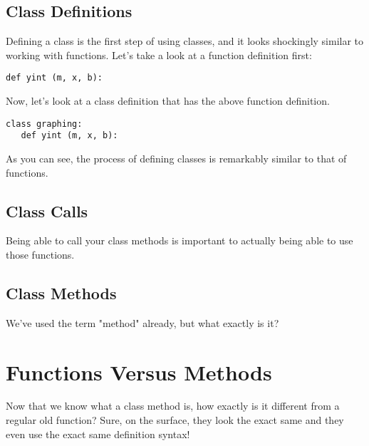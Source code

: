 \subsection{Class Definitions}
Defining a class is the first step of using classes, and it looks shockingly similar to working with functions. Let's take a look at a function definition first:\par
\begin{lstlisting}[style=pippython]
def yint (m, x, b):
\end{lstlisting}
Now, let's look at a class definition that has the above function definition.\par
\begin{lstlisting}[style=pippython]
class graphing:
   def yint (m, x, b):
\end{lstlisting}
As you can see, the process of defining classes is remarkably similar to that of functions.
\subsection{Class Calls}
Being able to call your class methods is important to actually being able to use those functions.
\subsection{Class Methods}
We've used the term "method" already, but what exactly is it?
\section{Functions Versus Methods}
Now that we know what a class method is, how exactly is it different from a regular old function? Sure, on the surface, they look the exact same and they even use the exact same definition syntax!

